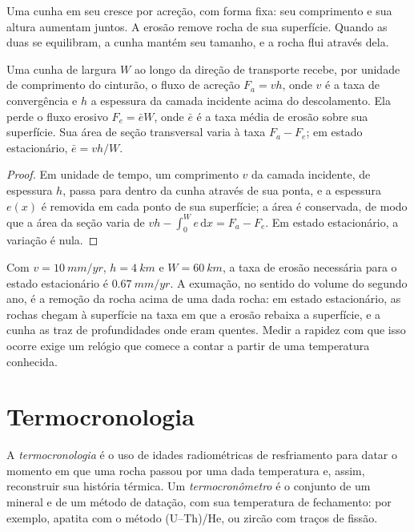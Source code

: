 Uma cunha em seu  cresce por acreção, com forma fixa: seu comprimento
e sua altura aumentam juntos. A erosão remove rocha de sua superfície. Quando as
duas se equilibram, a cunha mantém seu tamanho, e a rocha flui através dela.

\begin{proposition}\label{prop:b3:orogenic-wedges:flux}
Uma cunha de largura $W$ ao longo da direção de transporte recebe, por unidade de comprimento
do cinturão, o fluxo de acreção $F_a = v h$, onde $v$ é a taxa de convergência
e $h$ a espessura da camada incidente acima do descolamento. Ela
perde o fluxo erosivo $F_e = \bar e W$, onde $\bar e$ é a taxa média de erosão
sobre sua superfície. Sua área de seção transversal varia à taxa $F_a -
F_e$; em estado estacionário, $\bar e = vh/W$.
\end{proposition}

\begin{proof}
Em unidade de tempo, um comprimento $v$ da camada incidente, de espessura $h$, passa
para dentro da cunha através de sua ponta, e a espessura $e(x)$ é removida em cada
ponto de sua superfície; a área é conservada, de modo que a área da seção
varia de $vh - \int_0^W e\,\mathrm dx = F_a - F_e$. Em estado estacionário, a
variação é nula.
\end{proof}

Com $v = \qty{10}{mm/yr}$, $h = \qty{4}{km}$ e $W = \qty{60}{km}$, a
taxa de erosão necessária para o estado estacionário é $\qty{0.67}{mm/yr}$. A exumação, no
sentido do volume do segundo ano, é a remoção da rocha acima de uma dada rocha:
em estado estacionário, as rochas chegam à superfície na taxa em que a erosão rebaixa
a superfície, e a cunha as traz de profundidades onde eram quentes. Medir
a rapidez com que isso ocorre exige um relógio que comece a contar a partir de uma temperatura conhecida.

\section{Termocronologia}\label{sec:b3:orogenic-wedges:thermochronology}

\begin{definition}\label{def:b3:orogenic-wedges:thermochronology}
A \emph{termocronologia} é o uso de idades radiométricas
de resfriamento para datar o momento em que uma rocha passou por uma dada
temperatura e, assim, reconstruir sua história térmica. Um
\emph{termocronômetro} é o conjunto de um mineral e
de um método de datação, com sua temperatura de fechamento: por exemplo, apatita com o
método (U--Th)/He, ou zircão com traços de fissão.
\end{definition}


